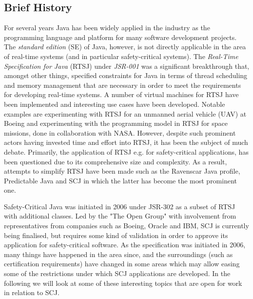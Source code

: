 \subsection{Brief History} %
\label{sub:brief_history_of_java_for_safety_critical_systems}
For several years Java has been widely applied in the industry as the programming language and platform for many software development projects. The \textit{standard edition} (SE) of Java, however, is not directly applicable in the area of real-time systems (and in particular safety-critical systems). The \textit{Real-Time Specification for Java} (RTSJ) under \textit{JSR-001}\cite{alan2001real, henties:2009-20} was a significant breakthrough that, amongst other things, specified constraints for Java in terms of thread scheduling and memory management that are necessary in order to meet the requirements for developing real-time systems. A number of virtual machines for RTSJ have been implemented and interesting use cases have been developed. Notable examples are experimenting with RTSJ for an unmanned aerial vehicle (UAV) at Boeing\cite{Armbruster:2007:RJV:1324969.1324974} and experimenting with the programming model in RTSJ for space missions, done in collaboration with NASA\cite{DBLP:conf/isorc/DvorakBCCCGIMMR04}. However, despite such prominent actors having invested time and effort into RTSJ, it has been the subject of much debate. Primarily, the application of RTSJ e.g. for safety-critical applications, has been questioned due to its comprehensive size and complexity. As a result, attempts to simplify RTSJ have been made such as the Ravenscar Java profile\cite{Kwon:2002:RHI:583810.583825}, Predictable Java\cite{Bogholm:2009:PJP:1620405.1620427} and SCJ in which the latter has become the most prominent one.

Safety-Critical Java was initiated in 2006 under JSR-302 as a subset of RTSJ with additional classes\cite{Schoeberl:2012:SCJonJava}. Led by the "The Open Group" with involvement from representatives from companies such as Boeing, Oracle and IBM, SCJ is currently being finalised, but requires some kind of validation in order to approve its application for safety-critical software. As the specification was initiated in 2006, many things have happened in the area since, and the surroundings (such as certification requirements) have changed in some areas which may allow easing some of the restrictions under which SCJ applications are developed. In the following we will look at some of these interesting topics that are open for work in relation to SCJ.

